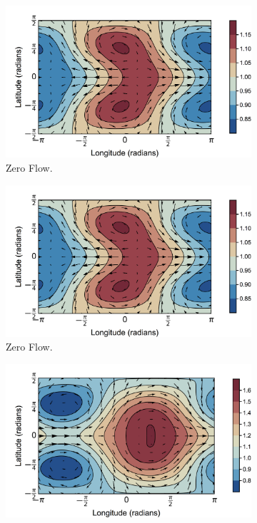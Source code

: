 \begin{figure}
  \centering
  \begin{subfigure}[b]{0.33\textwidth}
    \includegraphics[width=\textwidth]{figures/wave-mean-flow/spherical-matsuno.png}
    \caption{Zero Flow.}
    \label{fig:spherical-matsuno}
  \end{subfigure}
  \begin{subfigure}[b]{0.33\textwidth}
    \includegraphics[width=\textwidth]{figures/wave-mean-flow/spherical-matsuno.png}
    \caption{Zero Flow.}
    \label{fig:spherical-matsuno}
  \end{subfigure}
  \begin{subfigure}[b]{0.33\textwidth}
    \includegraphics[width=\textwidth]{figures/wave-mean-flow/spherical-shear-2d.png}

\end{subfigure}
\end{figure}
